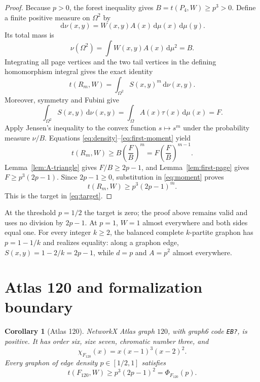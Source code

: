 \documentclass[11pt]{article}
\newtheorem{corollary}[theorem]{Corollary}
\newcommand{\dd}{\,\mathrm d}
\begin{document}
\begin{proof}
Because $p>0$, the forest inequality gives
$B=t(P_4,W)\geq p^3>0$.  Define a finite positive measure on
$\Omega^2$ by
\[
 \dd\nu(x,y)=W(x,y)A(x)\dd\mu(x)\dd\mu(y).
\]
Its total mass is
\[
 \nu(\Omega^2)=\int W(x,y)A(x)\dd\mu^2=B.
\]
Integrating all page vertices and the two tail vertices in the defining
homomorphism integral gives the exact identity
\begin{equation}
 t(R_m,W)=\int_{\Omega^2}S(x,y)^m\dd\nu(x,y).
 \label{eq:density}
\end{equation}
Moreover, symmetry and Fubini give
\begin{equation}
 \int_{\Omega^2}S(x,y)\dd\nu(x,y)
 =\int_\Omega A(x)\tau(x)\dd\mu(x)=F.
 \label{eq:first-moment}
\end{equation}
Apply Jensen's inequality to the convex function $s\mapsto s^m$ under
the probability measure $\nu/B$.  Equations
\eqref{eq:density}--\eqref{eq:first-moment} yield
\begin{equation}
 t(R_m,W)
 \geq B\left(\frac FB\right)^m
 =F\left(\frac FB\right)^{m-1}.
 \label{eq:moment}
\end{equation}
Lemma~\ref{lem:A-triangle} gives $F/B\geq2p-1$, and
Lemma~\ref{lem:first-page} gives $F\geq p^3(2p-1)$.  Since
$2p-1\geq0$, substitution in \eqref{eq:moment} proves
\[
 t(R_m,W)\geq p^3(2p-1)^m.
\]
This is the target in \eqref{eq:target}.
\end{proof}

At the threshold $p=1/2$ the target is zero; the proof above remains valid
and uses no division by $2p-1$.  At $p=1$, $W=1$ almost everywhere and
both sides equal one.  For every integer $k\geq2$, the balanced complete
$k$-partite graphon has $p=1-1/k$ and realizes equality: along a graphon
edge, $S(x,y)=1-2/k=2p-1$, while $d=p$ and $A=p^2$ almost everywhere.


\section{Atlas 120 and formalization boundary}

\begin{corollary}[Atlas 120]
NetworkX Atlas graph $120$, with graph6 code
\texttt{EB?}, is positive.  It has order six, size seven,
chromatic number three, and
\[
 \chi_{F_{120}}(x)=x(x-1)^3(x-2)^2.
\]
Every graphon of edge density $p\in[1/2,1]$ satisfies
\[
 t(F_{120},W)\geq p^3(2p-1)^2=\Phi_{F_{120}}(p).
\]
\end{corollary}
\end{document}
